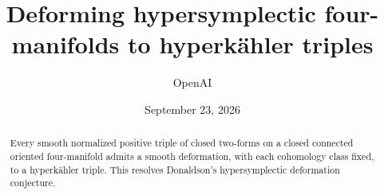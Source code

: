 \documentclass[11pt]{amsart}
\title[Deforming hypersymplectic four-manifolds]{Deforming hypersymplectic four-manifolds to hyperk\"ahler triples}
\author{OpenAI}
\date{September 23, 2026}
\begin{document}
\begin{abstract}
Every smooth normalized positive triple of closed two-forms on a closed
connected oriented four-manifold admits a smooth deformation, with each
cohomology class fixed, to a hyperk\"ahler triple.
This resolves Donaldson's hypersymplectic deformation conjecture.
\end{abstract}
\maketitle

\tableofcontents












\end{document}
